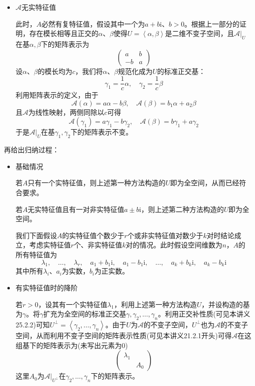 \documentclass[a4paper,UTF8,fontset=windows,AutoFakeBold]{ctexart}
\newcommand*{\ir}{\mathrm{i}}
\newcommand*{\ma}{\mathcal{A}}
\begin{document}
\begin{enumerate}
\begin{enumerate}
\begin{itemize}
\begin{itemize}
                \item $\ma$无实特征值
                
                此时，$A$必然有复特征值，假设其中一个为$a+b\ir$、$b>0$。根据上一部分的证明，存在模长相等且正交的$\alpha$、$\beta$使得$U=\left<\alpha,\beta\right>$是二维不变子空间，且$\ma|_U$在基$\alpha,\beta$下的矩阵表示为
                $$\begin{pmatrix}a&b\\-b&a\end{pmatrix}$$
                设$\alpha$、$\beta$的模长均为$c$，我们将$\alpha$、$\beta$规范化成为$U$的标准正交基：
                $$\gamma_1=\frac{1}{c}\alpha,\quad\gamma_2=\frac{1}{c}\beta$$
                利用矩阵表示的定义，由于
                $$\ma(\alpha)=a\alpha-b\beta,\quad\ma(\beta)=b_1\alpha+a_2\beta$$
                且$\ma$为线性映射，两侧同除以$c$可得
                $$\ma(\gamma_1)=a\gamma_1-b\gamma_2,\quad\ma(\beta)=b\gamma_1+a\gamma_2$$
                于是$\ma|_U$在基$\gamma_1,\gamma_2$下的矩阵表示不变。
            \end{itemize}

            再给出归纳过程：
            \begin{itemize}
                \item 基础情况
                
                若$A$只有一个实特征值，则上述第一种方法构造的$U$即为全空间，从而已经符合要求。

                若$A$无实特征值且有一对非实特征值$a\pm b\ir$，则上述第二种方法构造的$U$即为全空间。

                我们下面假设$A$的实特征值个数少于$r$个或非实特征值对数少于$k$对时结论成立，考虑实特征值$r$个、非实特征值$k$对的情况。此时假设空间维数为$n$，$A$的所有特征值为
                $$\lambda_1,\quad\dots,\quad\lambda_r,\quad a_1+b_1\ir,\quad a_1-b_1\ir,\quad\dots,\quad a_k+b_k\ir,\quad a_k-b_k\ir$$
                其中所有$\lambda_i$、$a_i$为实数，$b_i$为正实数。
                
                \item 有实特征值时的降阶
                
                若$r>0$，设其有一个实特征值$\lambda_1$，利用上述第一种方法构造$U$，并设构造的基为$\gamma$。将$\gamma$扩充为全空间的标准正交基$\gamma,\gamma_2,\dots,\gamma_n$。利用正交补性质(可见本讲义25.2.2)可知$U^\bot=\left<\gamma_2,\dots,\gamma_n\right>$。由于$U$为$\ma$的不变子空间，$U^\bot$也为$\ma$的不变子空间，从而利用不变子空间的矩阵表示性质(可见本讲义21.2.1开头)可得$\ma$在这组基下的矩阵表示为(未写出元素为0)
                $$\begin{pmatrix}\lambda_1\\ &A_0\end{pmatrix}$$
                这里$A_0$为$\ma|_{U^\bot}$在$\gamma_2,\dots,\gamma_n$下的矩阵表示。


\end{itemize}
\end{itemize}
\end{enumerate}
\end{enumerate}
\end{document}
